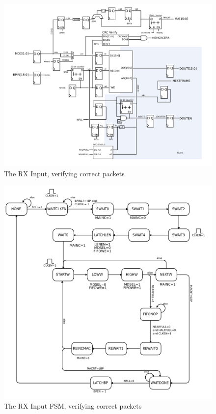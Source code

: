 \begin{figure}
\label{rxoutput}
\includegraphics[scale=0.7]{rxoutput.svg}
\caption{The RX Input, verifying correct packets}
\end{figure}

\begin{figure}
\label{rxoutputfsm}
\includegraphics[scale=0.7]{rxoutput.fsm.svg}
\caption{The RX Input FSM, verifying correct packets}
\end{figure}

